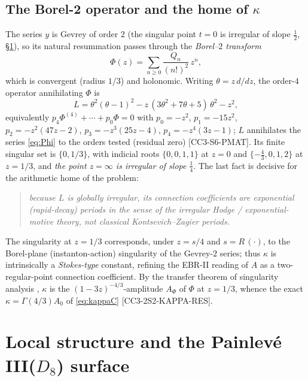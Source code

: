 \documentclass[11pt,reqno]{amsart}
\theoremstyle{plain}
\theoremstyle{definition}
\theoremstyle{remark}
\newcommand{\claim}[1]{\textsf{\small[#1]}}
\begin{document}
\subsection{The Borel-2 operator and the home of $\kappa$}\label{sec:borel}
The series $y$ is Gevrey of order $2$ (the singular point $t=0$ is irregular of
slope $\tfrac12$, \S\ref{sec:surface}), so its natural resummation passes
through the \emph{Borel--$2$ transform}
\begin{equation}\label{eq:Phi}
  \Phi(z)=\sum_{n\ge0}\frac{Q_{n}}{(n!)^{2}}\,z^{n},
\end{equation}
which is convergent (radius $1/3$) and holonomic. Writing $\theta=z\,d/dz$, the
order-$4$ operator annihilating $\Phi$ is
\begin{equation}\label{eq:L}
  L=\theta^{2}(\theta-1)^{2}-z\,(3\theta^{2}+7\theta+5)\,\theta^{2}-z^{2},
\end{equation}
equivalently $p_{4}\Phi^{(4)}+\cdots+p_{0}\Phi=0$ with
$p_{0}=-z^{2}$, $p_{1}=-15z^{2}$, $p_{2}=-z^{2}(47z-2)$,
$p_{3}=-z^{3}(25z-4)$, $p_{4}=-z^{4}(3z-1)$; $L$ annihilates the series
\eqref{eq:Phi} to the orders tested (residual zero) \claim{CC3-S6-PMAT}. Its
finite singular set is $\{0,1/3\}$, with indicial roots $\{0,0,1,1\}$ at $z=0$
and $\{-\tfrac43,0,1,2\}$ at $z=1/3$, and \emph{the point $z=\infty$ is
irregular of slope $\tfrac14$}. The last fact is decisive for the arithmetic
home of the problem:
\begin{quote}\itshape
because $L$ is globally irregular, its connection coefficients are exponential
(rapid-decay) periods in the sense of the irregular Hodge / exponential-motive
theory, not classical Kontsevich--Zagier periods.
\end{quote}
The singularity at $z=1/3$ corresponds, under $z=s/4$ and $s=R\,(\cdot)$, to the
Borel-plane (instanton-action) singularity of the Gevrey-$2$ series; thus
$\kappa$ is intrinsically a \emph{Stokes-type} constant, refining the EBR-II
reading of $A$ as a two-regular-point connection coefficient. By the transfer
theorem of singularity analysis \cite{FS}, $\kappa$ is the
$(1-3z)^{-4/3}$-amplitude $A_{\Phi}$ of $\Phi$ at $z=1/3$, whence the exact
$\kappa=\Gamma(4/3)A_{0}$ of \eqref{eq:kappaC} \claim{CC3-2S2-KAPPA-RES}.

\section{Local structure and the Painlev\'e III($D_{8}$) surface}\label{sec:surface}
\end{document}

